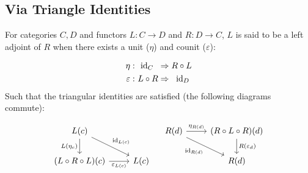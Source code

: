 \begin{definition}[Adjunction]

\end{definition}

\subsection{Via Triangle Identities}

\begin{definition}
  For categories $C,D$ and functors $L: C\to D$ and $R: D\to C$, $L$ is said to
  be a left adjoint of $R$ when there exists a unit ($\eta$) and counit
  ($\varepsilon$): \parencite{leinster:basic_category_theory}

  \[
    \begin{aligned}
      \eta&:\\
      \varepsilon&:
    \end{aligned}
    \ \begin{aligned}
      \mathrm{id}_C\ \:&\Rightarrow R \circ L\\
      L \circ R &\Rightarrow\ \:\mathrm{id}_D
    \end{aligned}
  \]
  Such that the triangular identities are satisfied (the following diagrams
  commute):

  \[\begin{tikzcd}[ampersand replacement=\&]
    {L(c)} \\
    {(L\circ R\circ L)(c)} \& {L(c)}
    \arrow["{L(\eta_c)}"', from=1-1, to=2-1]
    \arrow["{\varepsilon_{L(c)}}"', from=2-1, to=2-2]
    \arrow["{\id_{L(c)}}", from=1-1, to=2-2]
  \end{tikzcd}
  \quad
  \begin{tikzcd}[ampersand replacement=\&]
    {R(d)} \& {(R\circ L\circ R)(d)} \\
    \& {R(d)}
    \arrow["{\eta_{R(d)}}", from=1-1, to=1-2]
    \arrow["{R(\varepsilon_d)}", from=1-2, to=2-2]
    \arrow["{\id_{R(d)}}"', from=1-1, to=2-2]
  \end{tikzcd}\]
\end{definition}

